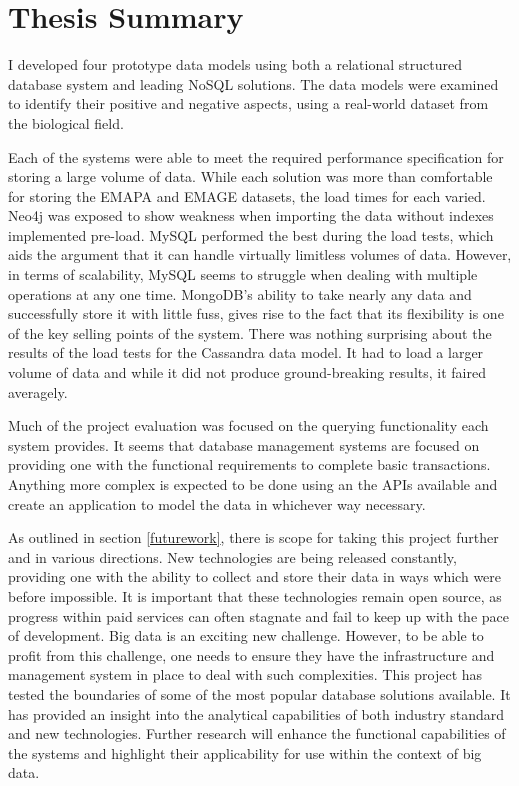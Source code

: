 \section{Thesis Summary}\label{summary}
I developed four prototype data models using both a relational structured database system and leading NoSQL solutions. The data models were examined to identify their positive and negative aspects, using a real-world dataset from the biological field.

Each of the systems were able to meet the required performance specification for storing a large volume of data. While each solution was more than comfortable for storing the EMAPA and EMAGE datasets, the load times for each varied. Neo4j was exposed to show weakness when importing the data without indexes implemented pre-load. MySQL performed the best during the load tests, which aids the argument that it can handle virtually limitless volumes of data. However, in terms of scalability, MySQL seems to struggle when dealing with multiple operations at any one time. MongoDB's ability to take nearly any data and successfully store it with little fuss, gives rise to the fact that its flexibility is one of the key selling points of the system. There was nothing surprising about the results of the load tests for the Cassandra data model. It had to load a larger volume of data and while it did not produce ground-breaking results, it faired averagely.

Much of the project evaluation was focused on the querying functionality each system provides. It seems that database management systems are focused on providing one with the functional requirements to complete basic transactions. Anything more complex is expected to be done using an the APIs available and create an application to model the data in whichever way necessary.

As outlined in section \ref{futurework}, there is scope for taking this project further and in various directions. New technologies are being released constantly, providing one with the ability to collect and store their data in ways which were before impossible. It is important that these technologies remain open source, as progress within paid services can often stagnate and fail to keep up with the pace of development. Big data is an exciting new challenge. However, to be able to profit from this challenge, one needs to ensure they have the infrastructure and management system in place to deal with such complexities. This project has tested the boundaries of some of the most popular database solutions available. It has provided an insight into the analytical capabilities of both industry standard and new technologies. Further research will enhance the functional capabilities of the systems and highlight their applicability for use within the context of big data.